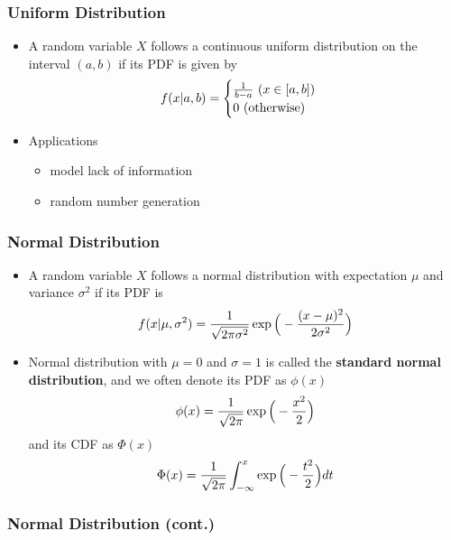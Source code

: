 \documentclass[pdflatex, 12pt]{beamer}
\begin{document}
\begin{frame}
\frametitle{Uniform Distribution}
\begin{itemize}
\item A random variable $X$ follows a continuous uniform distribution on the interval $(a, b)$ if its PDF is given by 
 \begin{equation}
 f(x|a, b) = 
 \begin{cases}
 \frac{1}{b- a} \ (x \in [a, b]) \\
 0 \ (\mathrm{otherwise})
 \end{cases} \notag
 \end{equation}
\vspace{0.2cm}
\item Applications
 \begin{itemize}
 \item model lack of information
 \item random number generation
 \end{itemize}
\end{itemize}
\end{frame}

\begin{frame}
\frametitle{Normal Distribution}
\begin{itemize}
\item A random variable $X$ follows a normal distribution with expectation $\mu$ and variance $\sigma^2$ if its PDF is 
 \begin{equation}
 f(x|\mu, \sigma^2) = \frac{1}{\sqrt{2\pi \sigma^2}} \exp\Big(-\frac{(x - \mu)^2}{2\sigma^2}\Big) \notag
 \end{equation}
\vspace{0.2cm}
\item Normal distribution with $\mu = 0$ and $\sigma = 1$ is called the \textbf{standard normal distribution}, and we often denote its PDF as $\phi(x)$ 
 \begin{equation}
 \phi(x) = \frac{1}{\sqrt{2\pi}} \exp\Big(-\frac{x^2}{2}\Big) \notag
 \end{equation}
and its CDF as $\Phi(x)$
 \begin{equation}
 \Phi(x) = \frac{1}{\sqrt{2\pi}} \int_{-\infty}^x \exp\Big(-\frac{t^2}{2}\Big) dt \notag
 \end{equation}
\end{itemize}
\end{frame}

\begin{frame}
\frametitle{Normal Distribution (cont.)}
\end{frame}
\end{document}
